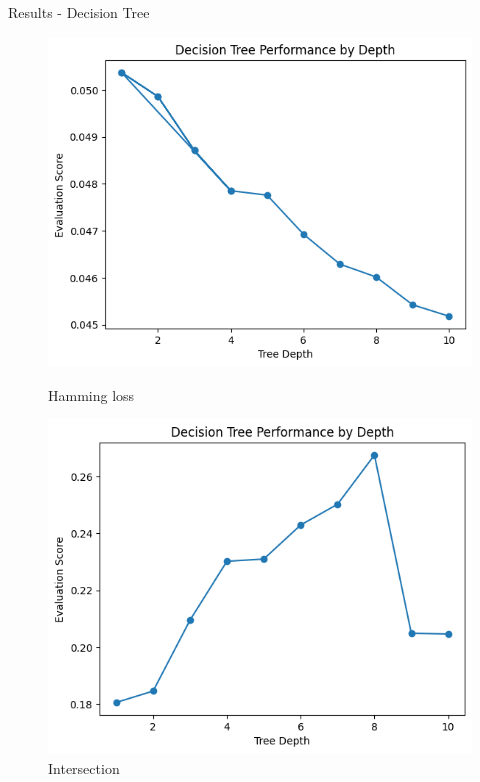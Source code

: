 \documentclass{beamer}
\begin{document}
\begin{frame}[t]{Results - Decision Tree}
\begin{figure}[h]
\begin{minipage}{0.3\textwidth}
	\end{minipage}
	\hfill
	\begin{minipage}{0.3\textwidth}
		\centering
		\includegraphics[width=\linewidth]{images/DecisionTree/hammingloss.png}
		\caption{Hamming loss}
	\end{minipage}
	\vfill
	\begin{minipage}{0.3\textwidth}
		\centering
		\includegraphics[width=\linewidth]{images/DecisionTree/jaccardscore.png}
		\caption{Intersection}
	\end{minipage}
	\hfill
	\begin{minipage}{0.3\textwidth}
		\centering

\end{minipage}
\end{figure}
\end{frame}
\end{document}
